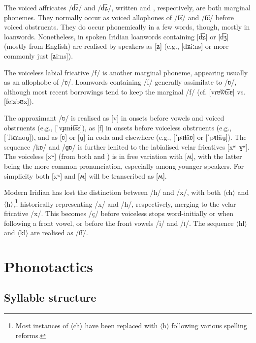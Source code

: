 The voiced affricates /d͡z/ and /d͡ʑ/, written  and , respectively, are both marginal phonemes. They normally occur as voiced allophones of  /t͡s/ and /t͡ɕ/ before voiced obstruents. They do occur phonemically in a few words, though, mostly in loanwords. Nonetheless, in spoken Iridian loanwords containing [d͡ʑ] or [d͡ʒ] (mostly from English) are realised by speakers as [ʑ] (e.g.,  [dʑiːns] or more commonly just [ʑiːns]).


The voiceless labial fricative /f/ is another marginal phoneme, appearing usually as an allophobe of /ʋ/. Loanwords containing /f/ generally assimilate to /ʋ/, although most recent borrowings tend to keep the marginal /f/ (cf.  [vɾɐ̃w̃t͡sɐ] vs.  [feːzbʊx]).

The approximant /ʋ/ is realised as [v] in onsets before vowels and voiced obstruents (e.g.,  [ˈvɟɪnɨt͡sɛ]), as [f] in onsets before voiceless obstruents (e.g.,  [ˈftɛɾnou̯]), and as [ʋ] or [u̯] in coda and elsewhere (e.g.,  [ˈpʲɪɫäʋ] or [ˈpʲɪɫäu̯]). The sequence /kʋ/ and /ɡʋ/ is further lenited to the labialised velar fricatives [xʷ~ɣʷ]. The voiceless [xʷ] (from both  and ) is in free variation with [ʍ], with the latter being the more common pronunciation, especially among younger speakers. For simplicity both [xʷ] and [ʍ] will be transcribed as [ʍ].

Modern Iridian has lost the distinction between /h/ and /x/, with both $\langle$ch$\rangle$ and $\langle$h$\rangle$,\footnote{Most instances of $\langle$ch$\rangle$ have been replaced with $\langle$h$\rangle$ following various spelling reforms.} historically representing /x/ and /h/, respectively, merging to the velar fricative /x/. This becomes /ç/ before voiceless stops word-initially or when following a front vowel, or before the front vowels /i/ and /ɪ/. The sequence $\langle$hl$\rangle$ and $\langle$kl$\rangle$ are realised as /t͡ɬ/.


\section{Phonotactics}\label{sec:phonotactics}

\subsection{Syllable structure}\label{sec:syllable-structure}

